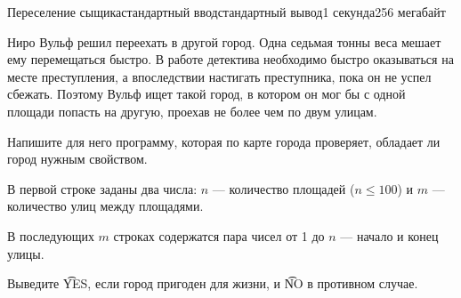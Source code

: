 \begin{problem}{Переселение сыщика}{стандартный ввод}{стандартный вывод}{1 секунда}{256 мегабайт}

Ниро Вульф решил переехать в другой город. Одна седьмая тонны веса мешает ему перемещаться быстро. В работе детектива необходимо быстро оказываться на месте преступления, а впоследствии настигать преступника, пока он не успел сбежать. Поэтому Вульф ищет такой город, в котором он мог бы с одной площади попасть на другую, проехав не более чем по двум улицам.

Напишите для него программу, которая по карте города проверяет, обладает ли город нужным свойством.

\InputFile
В первой строке заданы два числа: $n$ --- количество площадей ($n \le 100$) и $m$ --- количество улиц между площадями.

В последующих $m$ строках содержатся пара чисел от 1 до $n$ --- начало и конец улицы.

\OutputFile
Выведите \t{YES}, если город пригоден для жизни, и \t{NO} в противном случае.

\Examples

\begin{example}
%
%
\end{example}

\end{problem}

